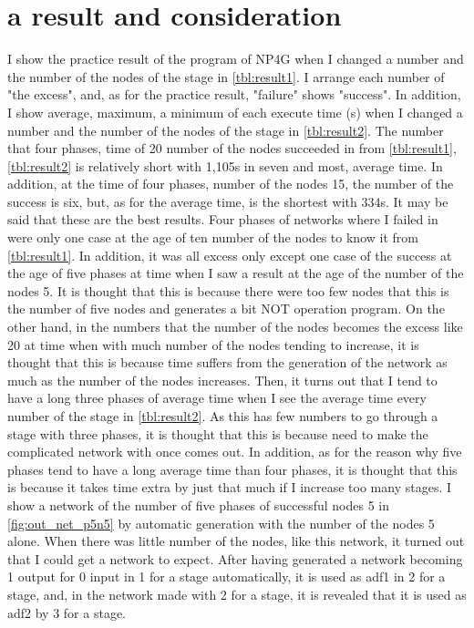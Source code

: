 \documentclass{article}
\begin{document}
\section {a result and consideration}
I show the practice result of the program of NP4G when I changed a number and the number of the nodes of the stage in \ref{tbl:result1}.
I arrange each number of "the excess", and, as for the practice result, "failure" shows "success".
In addition, I show average, maximum, a minimum of each execute time (s) when I changed a number and the number of the nodes of the stage in \ref{tbl:result2}.
The number that four phases, time of 20 number of the nodes succeeded in from \ref{tbl:result1}, \ref{tbl:result2} is relatively short with 1,105s in seven and most, average time.
In addition, at the time of four phases, number of the nodes 15, the number of the success is six, but, as for the average time, is the shortest with 334s.
It may be said that these are the best results.
Four phases of networks where I failed in were only one case at the age of ten number of the nodes to know it from \ref{tbl:result1}.
In addition, it was all excess only except one case of the success at the age of five phases at time when I saw a result at the age of the number of the nodes 5.
It is thought that this is because there were too few nodes that this is the number of five nodes and generates a bit NOT operation program.
On the other hand, in the numbers that the number of the nodes becomes the excess like 20 at time when with much number of the nodes tending to increase, it is thought that this is because time suffers from the generation of the network as much as the number of the nodes increases.
Then, it turns out that I tend to have a long three phases of average time when I see the average time every number of the stage in \ref{tbl:result2}.
As this has few numbers to go through a stage with three phases, it is thought that this is because need to make the complicated network with once comes out.
In addition, as for the reason why five phases tend to have a long average time than four phases, it is thought that this is because it takes time extra by just that much if I increase too many stages.
I show a network of the number of five phases of successful nodes 5 in \ref{fig:out_net_p5n5} by automatic generation with the number of the nodes 5 alone.
When there was little number of the nodes, like this network, it turned out that I could get a network to expect.
After having generated a network becoming 1 output for 0 input in 1 for a stage automatically, it is used as adf1 in 2 for a stage, and, in the network made with 2 for a stage, it is revealed that it is used as adf2 by 3 for a stage.
\end{document}
